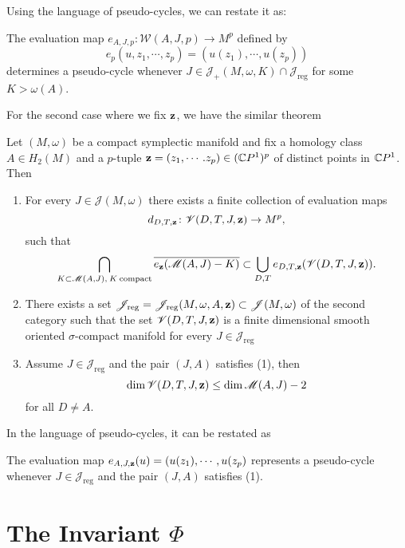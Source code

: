 \documentclass[twoside]{article}
\begin{document}
Using the language of pseudo-cycles, we can restate it as:

\begin{theorem}
    The evaluation map $e_{A,J,p}\colon \mathscr{W}(A,J,p)\rightarrow M^p$ defined by 
    \[e_p(u,z_1,\cdots,z_p)=(u(z_1),\cdots,u(z_p))\]
    determines a pseudo-cycle whenever $J\in\mathscr{J}_+(M,\omega,K)\cap \mathscr{J}_{\mathrm{reg}}$ 
    for some $K>\omega(A)$.
\end{theorem}

For the second case where we fix $\mathbf{z}$, we have the similar theorem

\begin{theorem}
    Let $(M,\omega)$ be a compact symplectic manifold and fix a homology class 
    $A\in H_2(M)$ and a $p$-tuple $\mathbf{z}=(z_1,\cdots.z_p)\in(\mathbb{C}P^{1})^p$ of distinct points in $\mathbb{C}P^{1}$. Then
    \begin{enumerate}
        \item For every $J\in\mathscr{J}(M,\omega)$ there exists a finite collection of evaluation maps
        \[d_{D,T,\mathbf{z}}\colon \mathscr{V}(D,T,J,\mathbf{z})\rightarrow M^p,\]
        such that
        \[\bigcap_{K\subset \mathscr{M}(A,J),\: K\: \mathrm{compact}}\overline{e_{\mathbf{z}}(\mathscr{M}(A,J)-K)}\subset\bigcup_{D,T}e_{D,T,\mathbf{z}}(\mathscr{V}(D,T,J,\mathbf{z})).\]
        \item There exists a set 
        $\mathscr{J}_{\mathrm{reg}}=\mathscr{J}_{\mathrm{reg}}(M,\omega,A,\mathbf{z})\subset \mathscr{J}(M,\omega)$ 
        of the second category such that the set $\mathscr{V}(D,T,J,\mathbf{z})$ is a 
        finite dimensional smooth oriented $\sigma$-compact manifold for every $J\in\mathscr{J}_{\mathrm{reg}}$
        \item  Assume $J\in \mathscr{J}_{\mathrm{reg}}$ and the pair $(J,A)$ satisfies \textup{(1)}, then
        \[\dim\mathscr{V}(D,T,J,\mathbf{z})\leq\dim\mathscr{M}(A,J)-2\]
        for all $D\neq A$.
    \end{enumerate}
\end{theorem}

In the language of pseudo-cycles, it can be restated as

\begin{theorem}
The evaluation map $e_{A,J,\mathbf{z}}(u)=(u(z_1),\cdots,u(z_p)$ represents 
a pseudo-cycle whenever $J\in \mathscr{J}_{\mathrm{reg}}$ and the pair $(J,A)$ satisfies \textup{(1)}.
\end{theorem}

\section{The Invariant \texorpdfstring{$\Phi$}{Φ}}
\end{document}
